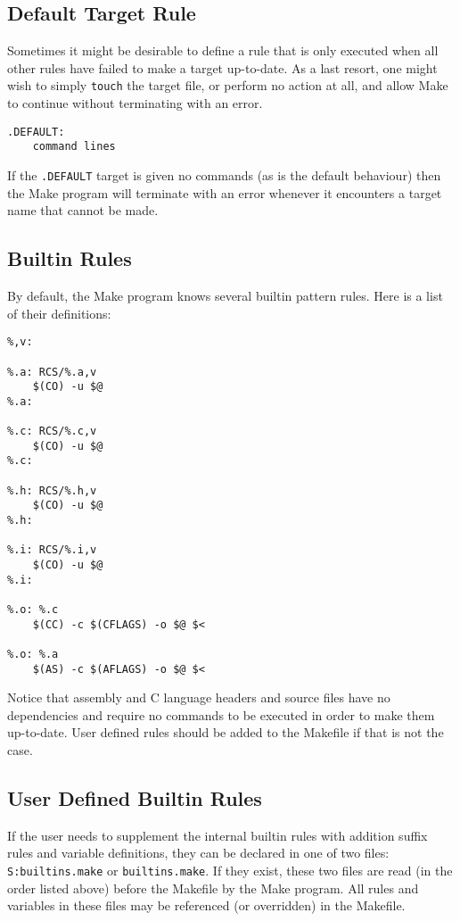 \subsection{Default Target Rule}

Sometimes it might be desirable to define a rule that is only executed when
all other rules have failed to make a target up-to-date.  As a last resort,
one might wish to simply {\tt touch} the target file, or perform no action
at all, and allow Make to continue without terminating with an error.

\begin{verbatim}
.DEFAULT:
    command lines
\end{verbatim}

If the {\tt .DEFAULT} target is given no commands (as is the default
behaviour) then the Make program will terminate with an error whenever it
encounters a target name that cannot be made.


\subsection{Builtin Rules}

By default, the Make program knows several builtin pattern rules.  Here is
a list of their definitions:

\begin{verbatim}
%,v:

%.a: RCS/%.a,v
    $(CO) -u $@
%.a:

%.c: RCS/%.c,v
    $(CO) -u $@
%.c:

%.h: RCS/%.h,v
    $(CO) -u $@
%.h:

%.i: RCS/%.i,v
    $(CO) -u $@
%.i:

%.o: %.c
    $(CC) -c $(CFLAGS) -o $@ $<

%.o: %.a
    $(AS) -c $(AFLAGS) -o $@ $<
\end{verbatim}

Notice that assembly and C language headers and source files have no
dependencies and require no commands to be executed in order to make them
up-to-date.  User defined rules should be added to the Makefile if that is
not the case.

\subsection{User Defined Builtin Rules}

If the user needs to supplement the internal builtin rules with addition
suffix rules and variable definitions, they can be declared in one of two
files:  {\tt S:builtins.make} or {\tt builtins.make}.  If they exist, these
two files are read (in the order listed above) before the Makefile by the
Make program.  All rules and variables in these files may be referenced (or
overridden) in the Makefile.


